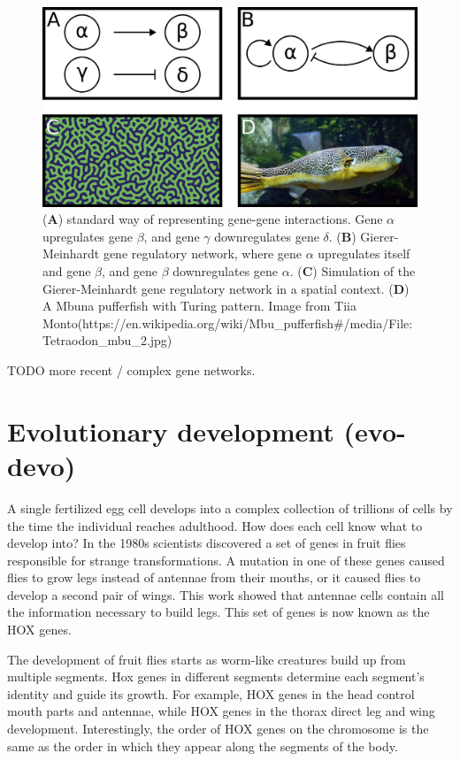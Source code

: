 \begin{figure}[H]
    \includegraphics[width=\linewidth]{ch.introduction/imgs/network.png}
    \caption{(\textbf{A}) standard way of representing gene-gene interactions. Gene $\alpha$ upregulates gene $\beta$, and gene $\gamma$ downregulates gene $\delta$. (\textbf{B}) Gierer-Meinhardt gene regulatory network, where gene $\alpha$ upregulates itself and gene $\beta$, and gene $\beta$ downregulates gene $\alpha$. (\textbf{C}) Simulation of the Gierer-Meinhardt gene regulatory network in a spatial context. (\textbf{D}) A Mbuna pufferfish with Turing pattern. Image from Tiia Monto(https://en.wikipedia.org/wiki/Mbu\_pufferfish\#/media/File:Tetraodon\_mbu\_2.jpg)}
    \label{fig:network}
\end{figure}

TODO more recent / complex gene networks. 

\section{Evolutionary development (evo-devo)}

A single fertilized egg cell develops into a complex collection of trillions of cells by the time the individual reaches adulthood. How does each cell know what to develop into? In the 1980s scientists discovered a set of genes in fruit flies responsible for strange transformations. A mutation in one of these genes caused flies to grow legs instead of antennae from their mouths\cite{Schneuwly1987}, or it caused flies to develop a second pair of wings\cite{Weatherbee1998}. This work showed that antennae cells contain all the information necessary to build legs. This set of genes is now known as the HOX genes.

The development of fruit flies starts as worm-like creatures build up from multiple segments. Hox genes in different segments determine each segment's identity and guide its growth. For example, HOX genes in the head control mouth parts and antennae, while HOX genes in the thorax direct leg and wing development. Interestingly, the order of HOX genes on the chromosome is the same as the order in which they appear along the segments of the body. 

